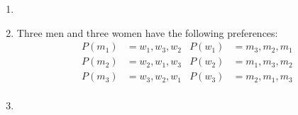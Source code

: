 \documentclass[11pt]{article}
\begin{document}
\begin{enumerate}
\begin{enumerate}
	\end{enumerate}
	\item 
	\item Three men and three women have the following preferences:
	\begin{align*}
		P(m_1) &= w_1, w_3, w_2 & P(w_1) &= m_3, m_2, m_1 \\
		P(m_2) &= w_2, w_1, w_3 & P(w_2) &= m_1, m_3, m_2 \\
		P(m_3) &= w_3, w_2, w_1 & P(w_3) &= m_2, m_1, m_3 \\
	\end{align*}
	\item 
\end{enumerate}
\end{document}
